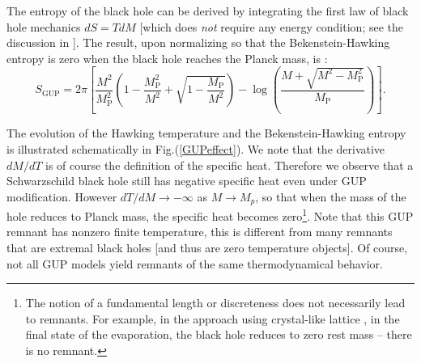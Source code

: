 \documentclass[12pt]{article}
\newcommand{\2}{$^2$}
\newcommand{\3}{$^3$}
\newcommand{\4}{$_4$}
\newcommand{\5}{$_5$}
\begin{document}
The entropy of the black hole can be derived by integrating the first law of black hole mechanics $dS= T dM$ [which does \emph{not} require any energy condition; see the discussion in \cite{primer}]. The result, upon normalizing so that the Bekenstein-Hawking entropy is zero when the black hole reaches the Planck mass, is \cite{pisin}:
\begin{equation}
S_{\text{GUP}} = 2\pi \left[\frac{M^2}{M_\text{P}^2}\left(1-\frac{M_\text{P}^2}{M^2}+\sqrt{1-\frac{M_\text{P}}{M^2}}\right)-\log\left(\frac{M+\sqrt{M^2-M_\text{P}^2}}{M_\text{P}}\right)\right].
\end{equation}

The evolution of the Hawking temperature and the Bekenstein-Hawking entropy is illustrated schematically in Fig.(\ref{GUPeffect}). We note that the derivative $dM/dT$ is of course the definition of the specific heat. Therefore we observe that a Schwarzschild black hole still has negative specific heat even under GUP modification. However $dT/dM \to -\infty$ as $M \to M_p$, so that when the mass of the hole reduces to Planck mass, the specific heat becomes zero\footnote{The notion of a fundamental length or discreteness does not necessarily lead to remnants. For example, in the approach using crystal-like lattice \cite{JKS}, in the final state of the evaporation, the black hole reduces to zero rest mass -- there is no remnant.}.  Note that this GUP remnant has nonzero finite temperature, this is different from many remnants that are extremal black holes [and thus are zero temperature objects]. Of course, not all GUP models yield remnants of the same thermodynamical behavior.
\end{document}
